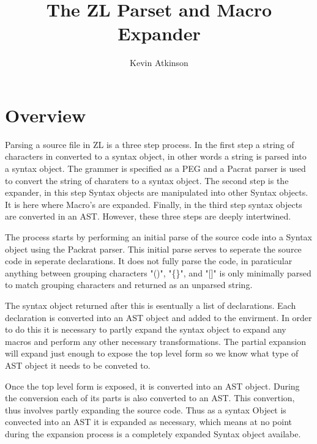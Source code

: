 \documentclass[12pt,english,letterpaper]{article}
\begin{document}
\title{The ZL Parset and Macro Expander}
\author{Kevin Atkinson}

\section{Overview}

Parsing a source file in ZL is a three step process.  In the first
step a string of characters in converted to a syntax object, in other
words a string is parsed into a syntax object.  The grammer is
specified as a PEG and a Pacrat parser is used to convert the string of
charaters to a syntax object.  The second step is the expander, in
this step Syntax objects are manipulated into other Syntax objects.
It is here where Macro's are expanded.  Finally, in the third step
syntax objects are converted in an AST.  However, these three steps
are deeply intertwined.

The process starts by performing an initial parse of the source code
into a Syntax object using the Packrat parser.  This initial parse
serves to seperate the source code in seperate declarations.  It does
not fully parse the code, in paraticular anything between grouping
characters "()", "\{\}", and "[]" is only minimally parsed to match
grouping characters and returned as an unparsed string.

The syntax object returned after this is esentually a list of
declarations.  Each declaration is converted into an AST object and
added to the envirment.  In order to do this it is necessary to partly
expand the syntax object to expand any macros and perform any other
necessary transformations.  The partial expansion will expand just
enough to expose the top level form so we know what type of AST object
it needs to be conveted to.

Once the top level form is exposed, it is converted into an AST
object.  During the conversion each of its parts is also converted to
an AST.  This convertion, thus involves partly expanding the source
code.  Thus as a syntax Object is convected into an AST it is expanded
as necessary, which means at no point during the expansion process is
a completely expanded Syntax object availabe.

%
\end{document}
